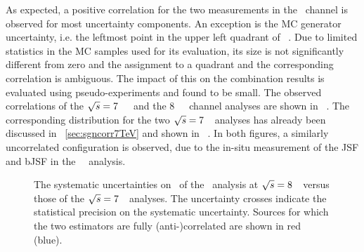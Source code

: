 As expected, a positive correlation for the two measurements in the \dil\ channel is observed for most uncertainty components. 
%
An exception is the \gls{MC} generator uncertainty, i.e. the leftmost point in the upper left quadrant of \fig~. Due to limited statistics in the \gls{MC} samples used for its evaluation, its size is not significantly different from zero and the assignment to a quadrant and the corresponding correlation is ambiguous. The impact of this on the combination results is evaluated using pseudo-experiments and found to be small.
%
The observed correlations of the $\sqrts=7$~\TeV\ \ljets\ and the $8$~\TeV\ \dil\ channel analyses are shown in \fig~. The corresponding distribution for the two $\sqrts=7$~\TeV\ analyses has already been discussed in \sect~\ref{sec:sgncorr7TeV} and shown in \fig~. In both figures, a similarly uncorrelated configuration is observed, due to the in-situ measurement of the \gls{JSF} and \gls{bJSF} in the \threed\ \ljets\ analysis.
%
\begin{figure}[tbp!]
\centering
\caption[Estimator correlations for the $\sqrts=7$ and $8$~\TeV\ analyses]{
%
%
The systematic uncertainties on \mt\ of the \dil\ analysis at ${\sqrt{s}}=8$~\TeV\ versus those of the $\sqrts=7$~\TeV\ analyses. 
%
The uncertainty crosses indicate the statistical precision on the systematic uncertainty.
%
Sources for which the two estimators are fully (anti-)correlated are shown in red (blue).
%
\label{fig:rhoeval78TeV}}
\end{figure}
